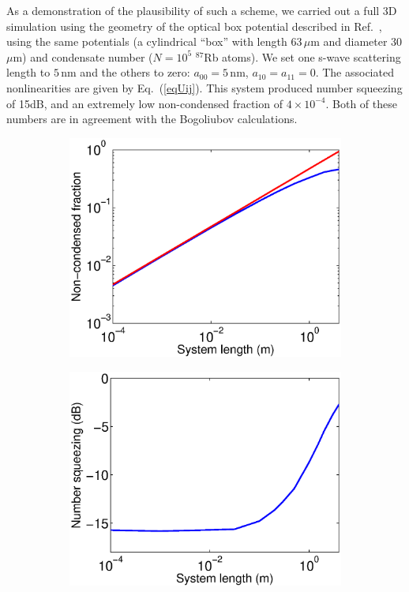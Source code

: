 \documentclass{iopart}
\begin{document}
As a demonstration of the plausibility of such a scheme, we carried out a full 3D simulation using the geometry of the optical box potential described in Ref.~\cite{gaunt2013}, using the same potentials (a cylindrical ``box'' with length 63\,$\mu$m and diameter 30\,$\mu$m) and condensate number ($N=10^5$ $^{87}$Rb atoms). We set one s-wave scattering length to $5$\,nm and the others to zero: $a_{00}=5$\,nm, $a_{10}=a_{11}=0$. The associated nonlinearities are given by Eq.~(\ref{eqUij}).  This system produced number squeezing of 15dB, and an extremely low non-condensed fraction of $4 \times 10^{-4}$. Both of these numbers are in agreement with the Bogoliubov calculations.

\begin{figure}
  \centering
  \begin{subfigure}{.48\textwidth}
    \centering
    \includegraphics[width=\textwidth]{figures/1D_Bog_mode_occupation_scaling.eps}
  \end{subfigure}
  \begin{subfigure}{.48\textwidth}
    \centering
    \includegraphics[width=\textwidth]{figures/1D_squeezing_scaling.eps}

\end{subfigure}
\end{figure}
\end{document}
